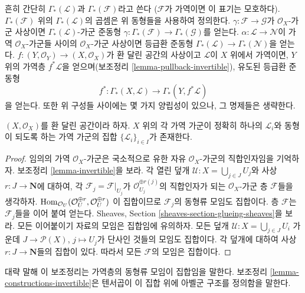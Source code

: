 \noindent
흔히 간단히 $\Gamma_*(\mathcal{L})$과 $\Gamma_*(\mathcal{F})$라고 쓴다
($\mathcal{F}$가 가역이면 이 표기는 모호하다).
$\Gamma_*(\mathcal{F})$ 위의 $\Gamma_*(\mathcal{L})$의 곱셈은
위 동형들을 사용하여 정의한다. $\gamma : \mathcal{F} \to \mathcal{G}$가
$\mathcal{O}_X$-가군 사상이면 $\Gamma_*(\mathcal{L})$-가군 준동형
$\gamma : \Gamma_*(\mathcal{F}) \to \Gamma_*(\mathcal{G})$를 얻는다.
$\alpha : \mathcal{L} \to \mathcal{N}$이 가역
$\mathcal{O}_X$-가군들 사이의 $\mathcal{O}_X$-가군 사상이면 등급환 준동형
$\Gamma_*(\mathcal{L}) \to \Gamma_*(\mathcal{N})$을 얻는다.
$f : (Y, \mathcal{O}_Y) \to (X, \mathcal{O}_X)$가 환 달린 공간의
사상이고 $\mathcal{L}$이 $X$ 위에서 가역이면, $Y$ 위의 가역층
$f^*\mathcal{L}$을 얻으며(보조정리 \ref{lemma-pullback-invertible}),
유도된 등급환 준동형
$$
f^* :
\Gamma_*(X, \mathcal{L})
\longrightarrow
\Gamma_*(Y, f^*\mathcal{L})
$$
을 얻는다. 또한 위 구성들 사이에는 몇 가지 양립성이 있으나,
그 명제들은 생략한다.

\begin{lemma}
\label{lemma-pic-set}
$(X, \mathcal{O}_X)$를 환 달린 공간이라 하자.
$X$ 위의 각 가역 가군이 정확히 하나의 $\mathcal{L}_i$와 동형이 되도록
하는 가역 가군의 집합 $\{\mathcal{L}_i\}_{i \in I}$가 존재한다.
\end{lemma}

\begin{proof}
임의의 가역 $\mathcal{O}_X$-가군은 국소적으로 유한 자유
$\mathcal{O}_X$-가군의 직합인자임을 기억하자. 보조정리
\ref{lemma-invertible}을 보라. 각 열린 덮개
$\mathcal{U} : X = \bigcup_{j \in J} U_j$와 사상
$r : J \to \mathbf{N}$에 대하여, 각
$\mathcal{F}_j = \mathcal{F}|_{U_j}$가
$\mathcal{O}_{U_j}^{\oplus r(j)}$의 직합인자가 되는
$\mathcal{O}_X$-가군 층 $\mathcal{F}$들을 생각하자.
$\mathop{\mathrm{Hom}}\nolimits_{\mathcal{O}_U}(\mathcal{O}_U^{\oplus r}, \mathcal{O}_U^{\oplus r})$
이 집합이므로 $\mathcal{F}_j$의 동형류 모임도 집합이다.
층 $\mathcal{F}$는 $\mathcal{F}_j$들을 이어 붙여 얻는다.
Sheaves, Section \ref{sheaves-section-glueing-sheaves}을 보라.
모든 이어붙이기 자료의 모임은 집합임에 유의하자.
모든 덮개 $\mathcal{U} : X = \bigcup_{j \in J} U_i$ 가운데
$J \to \mathcal{P}(X)$, $j \mapsto U_j$가 단사인 것들의 모임도
집합이다. 각 덮개에 대하여 사상
$r : J \to \mathbf{N}$들의 집합이 있다. 따라서 모든 $\mathcal{F}$의
모임은 집합이다.
\end{proof}

\noindent
대략 말해 이 보조정리는 가역층의 동형류 모임이 집합임을 말한다.
보조정리 \ref{lemma-constructions-invertible}은 텐서곱이 이 집합 위에
아벨군 구조를 정의함을 말한다.

